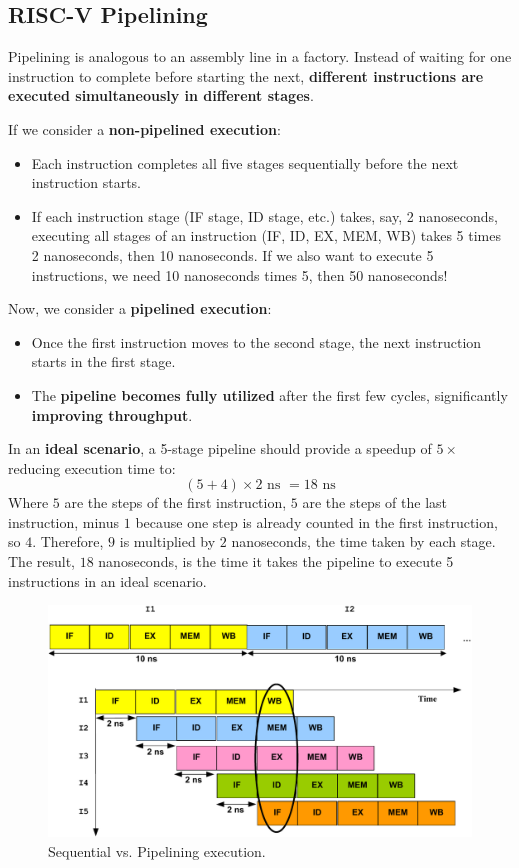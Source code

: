 \subsection{RISC-V Pipelining}

Pipelining is analogous to an assembly line in a factory. Instead of waiting for one instruction to complete before starting the next, \textbf{different instructions are executed simultaneously in different stages}.

\highspace
If we consider a \textbf{non-pipelined execution}:
\begin{itemize}
    \item Each instruction completes all five stages sequentially before the next instruction starts.
    \item If each instruction stage (IF stage, ID stage, etc.) takes, say, 2 nanoseconds, executing all stages of an instruction (IF, ID, EX, MEM, WB) takes 5 times 2 nanoseconds, then 10 nanoseconds. If we also want to execute 5 instructions, we need 10 nanoseconds times 5, then 50 nanoseconds!
\end{itemize}
Now, we consider a \textbf{pipelined execution}:
\begin{itemize}
    \item Once the first instruction moves to the second stage, the next instruction starts in the first stage.
    \item The \textbf{pipeline becomes fully utilized} after the first few cycles, significantly \textbf{improving throughput}.
\end{itemize}
In an \textbf{ideal scenario}, a 5-stage pipeline should provide a speedup of $5\times$ reducing execution time to:
\begin{equation*}
    \left(5+4\right) \times 2 \text{ ns } = 18 \text{ ns}
\end{equation*}
Where $5$ are the steps of the first instruction, $5$ are the steps of the last instruction, minus $1$ because one step is already counted in the first instruction, so $4$. Therefore, $9$ is multiplied by $2$ nanoseconds, the time taken by each stage. The result, $18$ nanoseconds, is the time it takes the pipeline to execute 5 instructions in an ideal scenario.

\begin{figure}[!htp]
    \centering
    \includegraphics[width=\textwidth]{img/sequential-vs-pipelining-1.pdf}
    \caption{Sequential vs. Pipelining execution.}
\end{figure}

